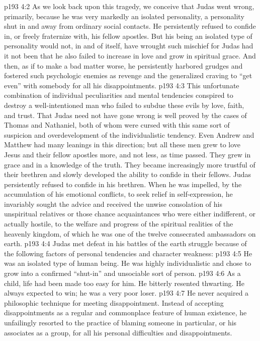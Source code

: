 \vs p193 4:2 As we look back upon this tragedy, we conceive that Judas went wrong, primarily, because he was very markedly an isolated personality, a personality shut in and away from ordinary social contacts. He persistently refused to confide in, or freely fraternize with, his fellow apostles. But his being an isolated type of personality would not, in and of itself, have wrought such mischief for Judas had it not been that he also failed to increase in love and grow in spiritual grace. And then, as if to make a bad matter worse, he persistently harbored grudges and fostered such psychologic enemies as revenge and the generalized craving to “get even” with somebody for all his disappointments.
\vs p193 4:3 This unfortunate combination of individual peculiarities and mental tendencies conspired to destroy a well\hyp{}intentioned man who failed to subdue these evils by love, faith, and trust. That Judas need not have gone wrong is well proved by the cases of Thomas and Nathaniel, both of whom were cursed with this same sort of suspicion and overdevelopment of the individualistic tendency. Even Andrew and Matthew had many leanings in this direction; but all these men grew to love Jesus and their fellow apostles more, and not less, as time passed. They grew in grace and in a knowledge of the truth. They became increasingly more trustful of their brethren and slowly developed the ability to confide in their fellows. Judas persistently refused to confide in his brethren. When he was impelled, by the accumulation of his emotional conflicts, to seek relief in self\hyp{}expression, he invariably sought the advice and received the unwise consolation of his unspiritual relatives or those chance acquaintances who were either indifferent, or actually hostile, to the welfare and progress of the spiritual realities of the heavenly kingdom, of which he was one of the twelve consecrated ambassadors on earth.
\vs p193 4:4 Judas met defeat in his battles of the earth struggle because of the following factors of personal tendencies and character weakness:
\pc \vs p193 4:5 \bibnobreakspace He was an isolated type of human being. He was highly individualistic and chose to grow into a confirmed “shut\hyp{}in” and unsociable sort of person.
\pc \vs p193 4:6 \bibnobreakspace As a child, life had been made too easy for him. He bitterly resented thwarting. He always expected to win; he was a very poor loser.
\pc \vs p193 4:7 \bibnobreakspace He never acquired a philosophic technique for meeting disappointment. Instead of accepting disappointments as a regular and commonplace feature of human existence, he unfailingly resorted to the practice of blaming someone in particular, or his associates as a group, for all his personal difficulties and disappointments.
